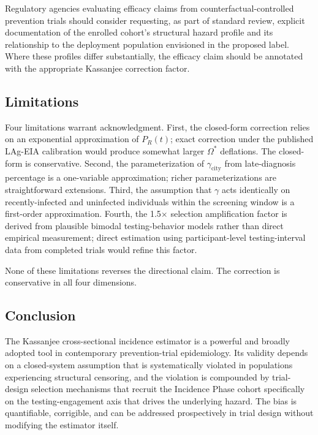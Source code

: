 \documentclass[11pt]{article}
\begin{document}
Regulatory agencies evaluating efficacy claims from counterfactual-controlled prevention trials should consider requesting, as part of standard review, explicit documentation of the enrolled cohort's structural hazard profile and its relationship to the deployment population envisioned in the proposed label. Where these profiles differ substantially, the efficacy claim should be annotated with the appropriate Kassanjee correction factor.

\subsection{Limitations}

Four limitations warrant acknowledgment. First, the closed-form correction relies on an exponential approximation of $P_R(t)$; exact correction under the published LAg-EIA calibration would produce somewhat larger $\Omega^*$ deflations. The closed-form is conservative. Second, the parameterization of $\gamma_{\mathrm{city}}$ from late-diagnosis percentage is a one-variable approximation; richer parameterizations are straightforward extensions. Third, the assumption that $\gamma$ acts identically on recently-infected and uninfected individuals within the screening window is a first-order approximation. Fourth, the 1.5$\times$ selection amplification factor is derived from plausible bimodal testing-behavior models rather than direct empirical measurement; direct estimation using participant-level testing-interval data from completed trials would refine this factor.

None of these limitations reverses the directional claim. The correction is conservative in all four dimensions.

\subsection{Conclusion}

The Kassanjee cross-sectional incidence estimator is a powerful and broadly adopted tool in contemporary prevention-trial epidemiology. Its validity depends on a closed-system assumption that is systematically violated in populations experiencing structural censoring, and the violation is compounded by trial-design selection mechanisms that recruit the Incidence Phase cohort specifically on the testing-engagement axis that drives the underlying hazard. The bias is quantifiable, corrigible, and can be addressed prospectively in trial design without modifying the estimator itself.
\end{document}
